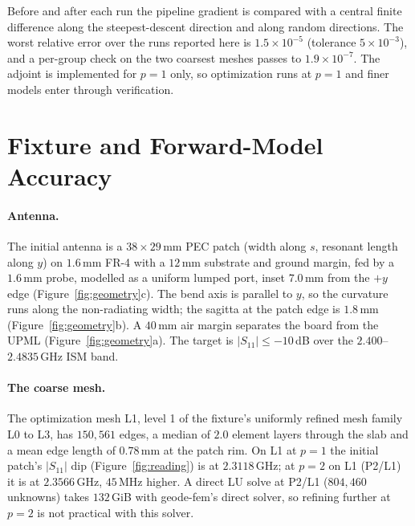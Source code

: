 \documentclass{anvil-paper}
\newcommand{\PL}{P2/L1}
\begin{document}
Before and after each run the pipeline gradient is compared with a central
finite difference along the steepest-descent direction and along random
directions. The worst relative error over the runs reported here is
$1.5\times10^{-5}$ (tolerance $5\times10^{-3}$), and a per-group check on the
two coarsest meshes passes to $1.9\times10^{-7}$. The adjoint is implemented
for $p = 1$ only, so optimization runs at $p = 1$ and finer models enter
through verification.

\section{Fixture and Forward-Model Accuracy}
\label{sec:accuracy}

\paragraph{Antenna.}
The initial antenna is a $38\times29$\,mm PEC patch (width along $s$,
resonant length along $y$) on $1.6$\,mm FR-4 with a $12$\,mm substrate and
ground margin, fed by a $1.6$\,mm probe, modelled as a uniform lumped port,
inset $7.0$\,mm from the $+y$ edge (Figure~\ref{fig:geometry}c). The bend axis
is parallel to $y$, so the curvature runs along the non-radiating width; the
sagitta at the patch edge is $1.8$\,mm (Figure~\ref{fig:geometry}b). A
$40$\,mm air margin separates the board from the UPML
(Figure~\ref{fig:geometry}a). The target is $|S_{11}| \le -10$\,dB over the
$2.400$--$2.4835$\,GHz ISM band.

\paragraph{The coarse mesh.}
The optimization mesh L1, level 1 of the fixture's uniformly refined mesh
family L0 to L3, has $150{,}561$ edges, a median of $2.0$ element
layers through the slab and a mean edge length of
$0.78$\,mm at the patch rim. On L1 at $p = 1$ the initial patch's
$|S_{11}|$ dip (Figure~\ref{fig:reading}) is at $2.3118$\,GHz; at $p = 2$ on L1 (\PL) it is at
$2.3566$\,GHz, $45$\,MHz higher. A direct LU solve at \PL{} ($804{,}460$
unknowns) takes $132$\,GiB with geode-fem's direct solver, so refining
further at $p = 2$ is not practical with this solver.
\end{document}
